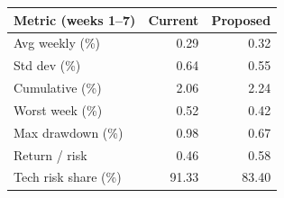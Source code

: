 \begin{tabular}{@{}lrr@{}}
\toprule
Metric (weeks 1--7) & Current & Proposed \\
\midrule
Avg weekly (\%) & 0.29 & 0.32 \\
Std dev (\%) & 0.64 & 0.55 \\
Cumulative (\%) & 2.06 & 2.24 \\
Worst week (\%) & \textminus{}0.52 & \textminus{}0.42 \\
Max drawdown (\%) & \textminus{}0.98 & \textminus{}0.67 \\
Return / risk & 0.46 & 0.58 \\
Tech risk share (\%) & 91.33 & 83.40 \\
\bottomrule
\end{tabular}